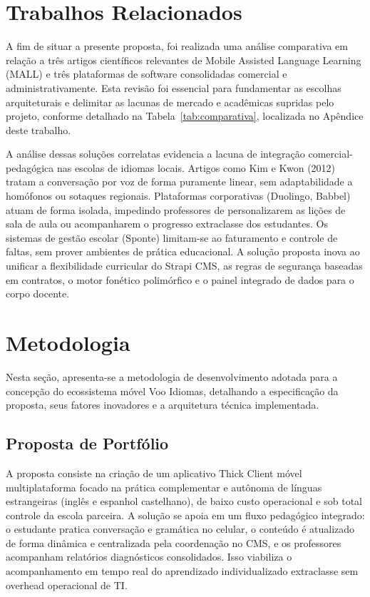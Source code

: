 \documentclass[portuguese]{sbcreviews-2025}%
\begin{document}
\section{Trabalhos Relacionados}
\label{sec:tr}

A fim de situar a presente proposta, foi realizada uma análise comparativa em relação a três artigos científicos relevantes de Mobile Assisted Language Learning (MALL) e três plataformas de software consolidadas comercial e administrativamente. Esta revisão foi essencial para fundamentar as escolhas arquiteturais e delimitar as lacunas de mercado e acadêmicas supridas pelo projeto, conforme detalhado na Tabela~\ref{tab:comparativa}, localizada no Apêndice deste trabalho.

A análise dessas soluções correlatas evidencia a lacuna de integração comercial-pedagógica nas escolas de idiomas locais. Artigos como Kim e Kwon (2012)~\cite{kim2012} tratam a conversação por voz de forma puramente linear, sem adaptabilidade a homófonos ou sotaques regionais. Plataformas corporativas (Duolingo, Babbel) atuam de forma isolada, impedindo professores de personalizarem as lições de sala de aula ou acompanharem o progresso extraclasse dos estudantes. Os sistemas de gestão escolar (Sponte) limitam-se ao faturamento e controle de faltas, sem prover ambientes de prática educacional. A solução proposta inova ao unificar a flexibilidade curricular do Strapi CMS, as regras de segurança baseadas em contratos, o motor fonético polimórfico e o painel integrado de dados para o corpo docente.

\section{Metodologia}
\label{sec:metodologia}

Nesta seção, apresenta-se a metodologia de desenvolvimento adotada para a concepção do ecossistema móvel Voo Idiomas, detalhando a especificação da proposta, seus fatores inovadores e a arquitetura técnica implementada.

\subsection{Proposta de Portfólio}
\label{sec:proposta}

A proposta consiste na criação de um aplicativo Thick Client móvel multiplataforma focado na prática complementar e autônoma de línguas estrangeiras (inglês e espanhol castelhano), de baixo custo operacional e sob total controle da escola parceira. A solução se apoia em um fluxo pedagógico integrado: o estudante pratica conversação e gramática no celular, o conteúdo é atualizado de forma dinâmica e centralizada pela coordenação no CMS, e os professores acompanham relatórios diagnósticos consolidados. Isso viabiliza o acompanhamento em tempo real do aprendizado individualizado extraclasse sem overhead operacional de TI.
\end{document}
